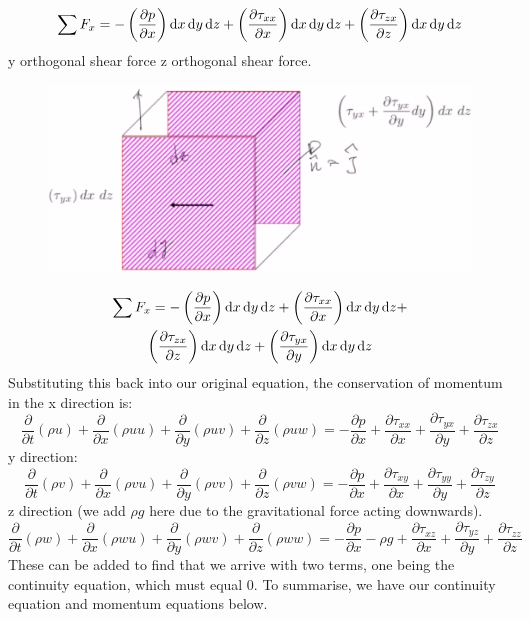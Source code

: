 \documentclass[class=report, crop=false, 12pt,a4paper]{standalone}
\begin{document}
\begin{equation}
  \sum F_x = - \left( \frac{\partial p}{\partial x} \right) \dif x \dif y \dif z + \left( \frac{\partial \tau_{xx}}{\partial x} \right) \dif x \dif y \dif z + \left( \frac{\partial \tau_{zx}}{\partial z} \right) \dif x \dif y \dif z
\end{equation}
y orthogonal shear force
z orthogonal shear force.
\begin{figure}[H]
  \centering
  \includegraphics[width = 0.6 \textwidth]{../img/forceinxz.png}
\end{figure}
\begin{multline}
  \sum F_x = - \left( \frac{\partial p}{\partial x} \right) \dif x \dif y \dif z + \left( \frac{\partial \tau_{xx}}{\partial x} \right) \dif x \dif y \dif z + \\ \left( \frac{\partial \tau_{zx}}{\partial z} \right) \dif x \dif y \dif z + \left( \frac{\partial \tau_{yx}}{\partial y} \right) \dif x \dif y \dif z
\end{multline}
Substituting this back into our original equation, the conservation of momentum in the x direction is:
\begin{equation}
  \frac{\partial}{\partial t} (\rho u ) + \frac{\partial}{\partial x} (\rho uu) + \frac{\partial}{\partial y} (\rho uv) + \frac{\partial}{\partial z} (\rho uw) = -\frac{\partial p}{\partial x} + \frac{\partial \tau_{xx}}{\partial x} + \frac{\partial \tau_{yx}}{\partial y} + \frac{\partial \tau_{zx}}{\partial z}
\end{equation}
y direction:
\begin{equation}
  \frac{\partial}{\partial t} (\rho v ) + \frac{\partial}{\partial x} (\rho vu) + \frac{\partial}{\partial y} (\rho vv) + \frac{\partial}{\partial z} (\rho vw) = -\frac{\partial p}{\partial x} + \frac{\partial \tau_{xy}}{\partial x} + \frac{\partial \tau_{yy}}{\partial y} + \frac{\partial \tau_{zy}}{\partial z}
\end{equation}
z direction (we add $\rho g$ here due to the gravitational force acting downwards).
\begin{equation}
  \frac{\partial}{\partial t} (\rho w ) + \frac{\partial}{\partial x} (\rho wu) + \frac{\partial}{\partial y} (\rho wv) + \frac{\partial}{\partial z} (\rho ww) = -\frac{\partial p}{\partial x} - \rho g + \frac{\partial \tau_{xz}}{\partial x} + \frac{\partial \tau_{yz}}{\partial y} + \frac{\partial \tau_{zz}}{\partial z}
\end{equation}
These can be added to find that we arrive with two terms, one being the continuity equation, which must equal 0. To summarise, we have our continuity equation and momentum equations below.
\end{document}
